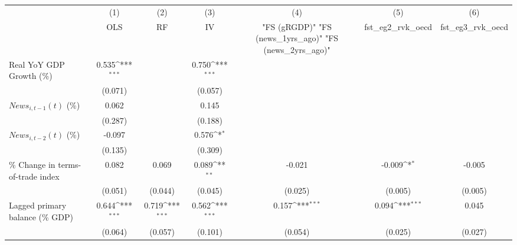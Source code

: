 {
\def\sym#1{\ifmmode^{#1}\else\(^{#1}\)\fi}
\begin{tabular}{l*{6}{c}}
\toprule
                    &\multicolumn{1}{c}{(1)}&\multicolumn{1}{c}{(2)}&\multicolumn{1}{c}{(3)}&\multicolumn{1}{c}{(4)}&\multicolumn{1}{c}{(5)}&\multicolumn{1}{c}{(6)}\\
                    &\multicolumn{1}{c}{OLS}&\multicolumn{1}{c}{RF}&\multicolumn{1}{c}{IV}&\multicolumn{1}{c}{ "FS (gRGDP)"  "FS (news_1yrs_ago)"  "FS (news_2yrs_ago)" }&\multicolumn{1}{c}{fst_eg2_rvk_oecd}&\multicolumn{1}{c}{fst_eg3_rvk_oecd}\\
\midrule
Real YoY GDP Growth (\%)&       0.535\sym{***}&                     &       0.750\sym{***}&                     &                     &                     \\
                    &     (0.071)         &                     &     (0.057)         &                     &                     &                     \\
\addlinespace
$ News_{i,t-1}(t)$ (\%)&       0.062         &                     &       0.145         &                     &                     &                     \\
                    &     (0.287)         &                     &     (0.188)         &                     &                     &                     \\
\addlinespace
$ News_{i,t-2}(t)$ (\%)&      -0.097         &                     &       0.576\sym{*}  &                     &                     &                     \\
                    &     (0.135)         &                     &     (0.309)         &                     &                     &                     \\
\addlinespace
\% Change in terms-of-trade index&       0.082         &       0.069         &       0.089\sym{**} &      -0.021         &      -0.009\sym{*}  &      -0.005         \\
                    &     (0.051)         &     (0.044)         &     (0.045)         &     (0.025)         &     (0.005)         &     (0.005)         \\
\addlinespace
Lagged primary balance (\% GDP)&       0.644\sym{***}&       0.719\sym{***}&       0.562\sym{***}&       0.157\sym{***}&       0.094\sym{***}&       0.045         \\
                    &     (0.064)         &     (0.057)         &     (0.101)         &     (0.054)         &     (0.025)         &     (0.027)         \\

\end{tabular}}
